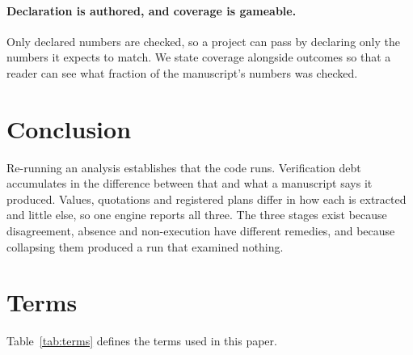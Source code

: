\documentclass{article}
\begin{document}
\paragraph{Declaration is authored, and coverage is gameable.} Only declared numbers are checked,
so a project can pass by declaring only the numbers it expects to match. We state coverage
alongside outcomes so that a reader can see what fraction of the manuscript's numbers was
checked.

\section{Conclusion}

Re-running an analysis establishes that the code runs. Verification debt accumulates in the
difference between that and what a manuscript says it produced. Values, quotations and registered
plans differ in how each is extracted and little else, so one engine reports all three. The three
stages exist because disagreement, absence and non-execution have different remedies, and because
collapsing them produced a run that examined nothing.




\clearpage
\appendix



\section{Terms}
\label{sec:terms}

Table~\ref{tab:terms} defines the terms used in this paper.
\end{document}

